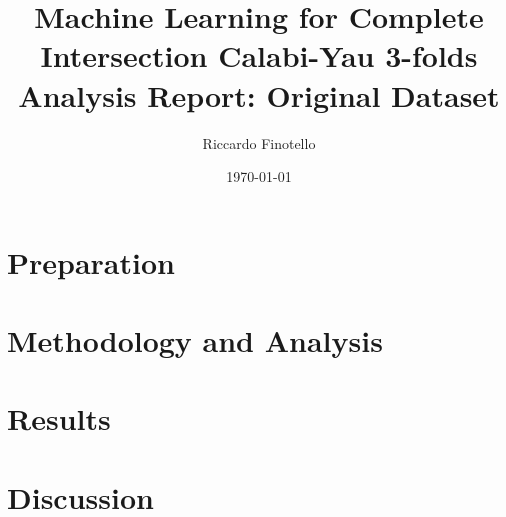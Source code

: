 \documentclass[10pt,a4paper]{article}
\author{Riccardo Finotello}
\title{
    Machine Learning for Complete Intersection Calabi-Yau 3-folds
    \\[0.3cm]
    \Large{\textbf{Analysis Report: Original Dataset}}
}
\date{\today}
\numberwithin{equation}{section}
\numberwithin{figure}{section}
\numberwithin{table}{section}
\begin{document}
    \maketitle
    
    \begin{abstract}
        
    \end{abstract}
    
    \clearpage
    \tableofcontents
    
    \clearpage
    \section{Preparation}
        
    
    \section{Methodology and Analysis}
        
    
    \section{Results}
        
        
    \section{Discussion}
        
    
    
    
\end{document}
